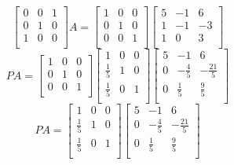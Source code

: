 \documentclass{article}
\begin{document}
        $$
        \begin{bmatrix}
          0 & 0 & 1 \\
          0 & 1 & 0 \\
          1 & 0 & 0 \\
      \end{bmatrix}
        A = 
        \begin{bmatrix}
            1 & 0 & 0 \\
            0 & 1 & 0 \\
            0 & 0 & 1 \\
        \end{bmatrix}
        \begin{bmatrix}
          5  & -1 & 6 \\
            1 & -1 & -3 \\
            1  & 0 & 3 \\
        \end{bmatrix}
          $$
          $$
          P
          A = 
          \begin{bmatrix}
            1 & 0 & 0 \\
            0 & 1 & 0 \\
            0 & 0 & 1 \\
        \end{bmatrix}
          \begin{bmatrix}
              1 & 0 & 0 \\
              \frac{1}{5} & 1 & 0 \\
              \frac{1}{5} & 0 & 1 \\
          \end{bmatrix}
          \begin{bmatrix}
            5  & -1 & 6 \\
              0 & -\frac{4}{5} & -\frac{21}{5} \\
              0  & \frac{1}{5} & \frac{9}{5} \\
          \end{bmatrix}
            $$
            $$
            P
            A = 
            \begin{bmatrix}
                1 & 0 & 0 \\
                \frac{1}{5} & 1 & 0 \\
                \frac{1}{5} & 0 & 1 \\
            \end{bmatrix}
            \begin{bmatrix}
              5  & -1 & 6 \\
                0 & -\frac{4}{5} & -\frac{21}{5} \\
                0  & \frac{1}{5} & \frac{9}{5} \\
            \end{bmatrix}
              $$
\end{document}

